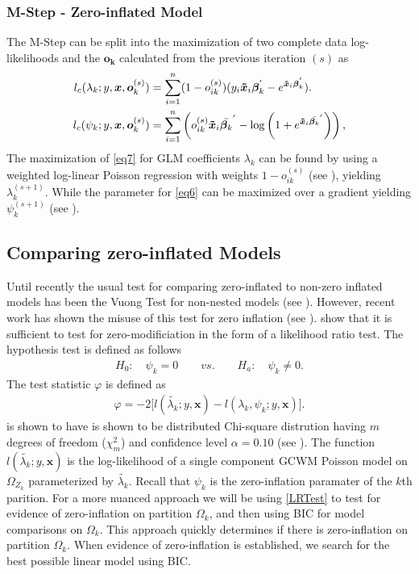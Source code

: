 \documentclass[11pt,letterpaper]{article}
\numberwithin{equation}{section}
\numberwithin{equation}{section}
\numberwithin{equation}{section}
\begin{document}
\subsubsection{M-Step - Zero-inflated Model} 
The M-Step can be split into the maximization of two complete data log-likelihoods and the $\bm{o_k}$ calculated from the previous iteration $(s)$ as
\begin{align}
 l_c(\lambda_k; y,\bm{x},\bm{o}_k^{(s)}) &= \sum_{i=1}^n (1- o_{ik}^{(s)}) (y_i \bm{\tilde{x}}_i \bm{\beta}_k^{'}  - e^{\bm{\tilde{x}}_i \bm{\beta}_k^{'}})\label{eq7}.\\
l_c(\psi_k;y,\bm{x},\bm{o}_k^{(s)}) &=\sum_{i=1}^n \left( o_{ik}^{(s)} \bm{\tilde{x}}_i \bar{\bm{\beta}_k }^{'} - \log \left(1+ e^{ \bm{\tilde{x}}_i \bar{\bm{\beta}_k }^{'}} \right) \right), \label{eq6}   
 \end{align}
The maximization of \eqref{eq7} for GLM coefficients $\lambda_k$ can be found by using a weighted log-linear Poisson regression with weights $1 - o_{ik}^{(s)}$ (see \cite{McCullaghNelder1989}), yielding $\lambda_k^{(s+1)}$.
While the parameter for \eqref{eq6} can be maximized over a gradient yielding $\psi_k^{(s+1)}$ (see \cite{Lambert}).

\subsection{Comparing zero-inflated Models}

Until recently the usual test for comparing zero-inflated to non-zero inflated models has been the Vuong Test for non-nested models (see \cite{vuongTest}). However, recent work has shown the misuse of this test for zero inflation (see \cite{misuse}). \cite{newIntuitive} show that it is sufficient to test for zero-modificiation in the form of a likelihood ratio test. The hypothesis test is defined as follows
\begin{align*}
& & H_0: \quad \psi_k = 0 \quad\quad vs. \quad\quad H_a: \quad \psi_k \neq 0 . & &
\end{align*}
The test statistic $\varphi$ is defined as 
\begin{align}
\varphi = -2 \bigg[l(\tilde{\lambda_k}; y, \bm{x}) - l(\lambda_k, \psi_k; y , \bm{x} )\bigg].
\label{LRTest}
\end{align}
is shown to have is shown to be distributed Chi-square distrution having $m$ degrees of freedom ($\chi^2_m $) and confidence level $\alpha = 0.10$ (see \cite{newIntuitive}). The function 
$l(\tilde{\lambda_k}; y , \bm{x})$ is the log-likelihood of a single component GCWM Poisson model on $\Omega_{Z_k}$ parameterized by $\tilde{\lambda_k}$. Recall that $\psi_k$ is the zero-inflation paramater of the $k$th parition. For a more nuanced approach we will be using \eqref{LRTest} to  test for evidence of zero-inflation on partition $\Omega_k$, and then using BIC for model comparisons on $\Omega_k$. This approach quickly determines if there is zero-inflation on partition $\Omega_k$.  When evidence of zero-inflation is established, we search for the best possible linear model using BIC. 
\end{document}
